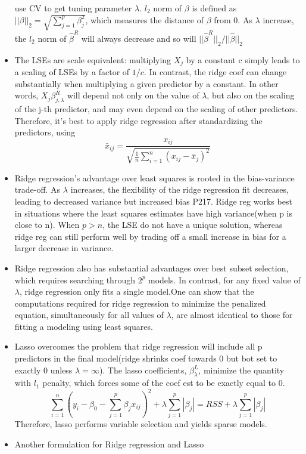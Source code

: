 \documentclass[a4paper, 12pt]{article}
\begin{document}
\begin{itemize}
\[	\]
	use CV to get tuning parameter $\lambda$. $l_2$ norm of $\beta$ is defined as $||\beta||_2=\sqrt{\sum_{j=1}^{p}\beta_j^2}$, which measures the distance of $\beta$ from 0. As $\lambda$ increase, the $l_2$ norm of $\hat{\beta}^R$ will always decrease and so will $||\hat{\beta}^R||_2/||\hat{\beta}||_2$
	\item The LSEs are scale equivalent: multiplying $X_j$ by a constant c simply leads to a scaling of LSEs by a factor of $1/c$. In contrast, the ridge coef can change substantially when multiplying a given predictor by a constant. In other words, $X_j\beta_{j,\lambda}^R$ will depend not only on the value of $\lambda$, but also on the scaling of the j-th predictor, and may even depend on the scaling of other predictors. Therefore, it's best to apply ridge regression after standardizing the predictors, using 
	\[\bar{x}_{ij}=\frac{x_{ij}}{\sqrt{\frac{1}{n}\sum_{i=1}^{n}(x_{ij}-\bar{x}_j)^2}}
	\]
	\item Ridge regression's advantage over least squares is rooted in the bias-variance trade-off. As $\lambda$ increases, the flexibility of the ridge regression fit decreases, leading to decreased variance but increased bias P217. Ridge reg works best in situations where the least squares estimates have high variance(when p is close to n). When $p > n$, the LSE do not have a unique solution, whereas ridge reg can still perform well by trading off a small increase in bias for a larger decrease in variance.
	\item Ridge regression also has substantial advantages over best subset selection, which requires searching through $2^p$ models. In contrast, for any fixed value of $\lambda$, ridge regression only fits a single model.One can show that the computations required for ridge regression to minimize the penalized equation, simultaneously for all values of $\lambda$, are almost identical to those for fitting a modeling using least squares.
	\item Lasso overcomes the problem that ridge regression will include all p predictors in the final model(ridge shrinks coef towards 0 but bot set to exactly 0 unless $\lambda=\infty$). The lasso coefficients, $\beta^L_{\lambda}$, minimize the quantity with $l_1$ penalty, which forces some of the coef est to be exactly equal to 0.
	\[	 \sum_{i=1}^{n}(y_i-\beta_0-\sum_{j=1}^{p}\beta_jx_{ij})^2 +\lambda\sum_{j=1}^{p}|\beta_j|= RSS +\lambda\sum_{j=1}^{p}|\beta_j|
	\]
    Therefore, lasso performs variable selection and yields sparse models.
    \item Another formulation for Ridge regression and Lasso

\end{itemize}
\end{document}
